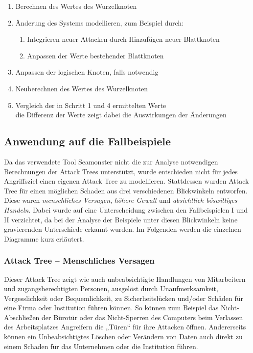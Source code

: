 \begin{enumerate}
\item Berechnen des Wertes des Wurzelknoten
\item Änderung des Systems modellieren, zum Beispiel durch:
\begin{enumerate}
\item Integrieren neuer Attacken durch Hinzufügen neuer Blattknoten
\item Anpassen der Werte bestehender Blattknoten
\end{enumerate}
\item Anpassen der logischen Knoten, falls notwendig
\item Neuberechnen des Wertes des Wurzelknoten
\item Vergleich der in Schritt 1 und 4 ermittelten Werte\\
die Differenz der Werte zeigt dabei die Auswirkungen der Änderungen
\end{enumerate}
\clearpage

\subsection{Anwendung auf die Fallbeispiele}
Da das verwendete Tool Seamonster nicht die zur Analyse notwendigen Berechnungen der Attack Trees unterstützt, wurde entschieden nicht für jedes Angriffsziel einen eigenen Attack Tree zu modellieren. Stattdessen wurden Attack Tree für einen möglichen Schaden aus drei verschiedenen Blickwinkeln entworfen. Diese waren \textit{menschliches Versagen}, \textit{höhere Gewalt} und \textit{absichtlich böswilliges Handeln}. Dabei wurde auf eine Unterscheidung zwischen den Fallbeispielen I und II verzichtet, da bei der Analyse der Beispiele unter diesen Blickwinkeln keine gravierenden Unterschiede erkannt wurden. Im Folgenden werden die einzelnen Diagramme kurz erläutert.

\subsubsection{Attack Tree – Menschliches Versagen}

Dieser Attack Tree zeigt wie auch unbeabsichtigte Handlungen von Mitarbeitern und zugangsberechtigten Personen, ausgelöst durch Unaufmerksamkeit, Vergesslichkeit oder Bequemlichkeit, zu Sicherheitslücken und/oder Schäden für eine Firma oder Institution führen können. So können zum Beispiel das Nicht-Abschließen der Bürotür oder das Nicht-Sperren des Computers beim Verlassen des Arbeitsplatzes Angreifern die „Türen“ für ihre Attacken öffnen. Andererseits können ein Unbeabsichtigtes Löschen oder Verändern von Daten auch direkt zu einem Schaden für das Unternehmen oder die Institution führen.

